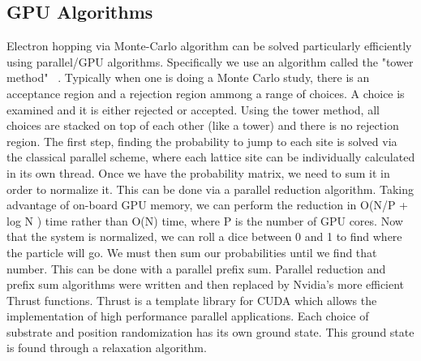 \subsection{GPU Algorithms}
Electron hopping via Monte-Carlo algorithm can be solved particularly efficiently using parallel/GPU algorithms. Specifically we use an algorithm called the "tower method" ~\cite{Krauth06}. Typically when one is doing a Monte Carlo study, there is an acceptance region and a rejection region ammong a range of choices. A choice is examined and it is either rejected or accepted. Using the tower method, all choices are stacked on top of each other (like a tower) and there is no rejection region. The first step, finding the probability to jump to each site is solved via the classical parallel scheme, where each lattice site can be individually calculated in its own thread. Once we have the probability matrix, we need to sum it in order to normalize it. This can be done via a parallel reduction algorithm. Taking advantage of on-board GPU memory, we can perform the reduction in O(N/P + log N ) time rather than O(N) time, where P is the number of GPU cores. Now that the system is normalized, we can roll a dice between 0 and 1 to find where the particle will go. We must then sum our probabilities until we find that number. This can be done with a parallel prefix sum. Parallel reduction and prefix sum algorithms were written and then replaced by Nvidia's more efficient Thrust functions. Thrust is a template library for CUDA which allows the implementation of high performance parallel applications. Each choice of substrate and position randomization has its own ground state. This ground state is found through a relaxation algorithm.






